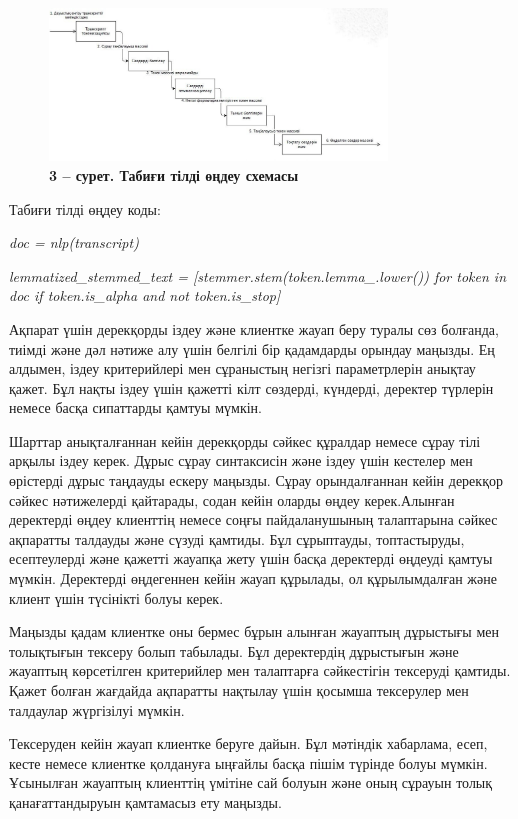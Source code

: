 \begin{figure}[H]
	\centering
	\includegraphics[width=0.8\textwidth]{assets/144}
	\caption*{\bfseries 3 -- сурет. Табиғи тілді өңдеу схемасы}
\end{figure}

Табиғи тілді өңдеу коды:

\emph{doc = nlp(transcript)}

\emph{lemmatized\_stemmed\_text = {[}stemmer.stem(token.lemma\_.lower())
for token in doc if token.is\_alpha and not token.is\_stop{]}}

Ақпарат үшін дерекқорды іздеу және клиентке жауап беру туралы сөз
болғанда, тиімді және дәл нәтиже алу үшін белгілі бір қадамдарды орындау
маңызды. Ең алдымен, іздеу критерийлері мен сұраныстың негізгі
параметрлерін анықтау қажет. Бұл нақты іздеу үшін қажетті кілт сөздерді,
күндерді, деректер түрлерін немесе басқа сипаттарды қамтуы мүмкін.

Шарттар анықталғаннан кейін дерекқорды сәйкес құралдар немесе сұрау тілі
арқылы іздеу керек. Дұрыс сұрау синтаксисін және іздеу үшін кестелер мен
өрістерді дұрыс таңдауды ескеру маңызды. Сұрау орындалғаннан кейін
дерекқор сәйкес нәтижелерді қайтарады, содан кейін оларды өңдеу
керек.Алынған деректерді өңдеу клиенттің немесе соңғы пайдаланушының
талаптарына сәйкес ақпаратты талдауды және сүзуді қамтиды. Бұл
сұрыптауды, топтастыруды, есептеулерді және қажетті жауапқа жету үшін
басқа деректерді өңдеуді қамтуы мүмкін. Деректерді өңдегеннен кейін
жауап құрылады, ол құрылымдалған және клиент үшін түсінікті болуы керек.

Маңызды қадам клиентке оны бермес бұрын алынған жауаптың дұрыстығы мен
толықтығын тексеру болып табылады. Бұл деректердің дұрыстығын және
жауаптың көрсетілген критерийлер мен талаптарға сәйкестігін тексеруді
қамтиды. Қажет болған жағдайда ақпаратты нақтылау үшін қосымша
тексерулер мен талдаулар жүргізілуі мүмкін.

Тексеруден кейін жауап клиентке беруге дайын. Бұл мәтіндік хабарлама,
есеп, кесте немесе клиентке қолдануға ыңғайлы басқа пішім түрінде болуы
мүмкін. Ұсынылған жауаптың клиенттің үмітіне сай болуын және оның
сұрауын толық қанағаттандыруын қамтамасыз ету маңызды.

